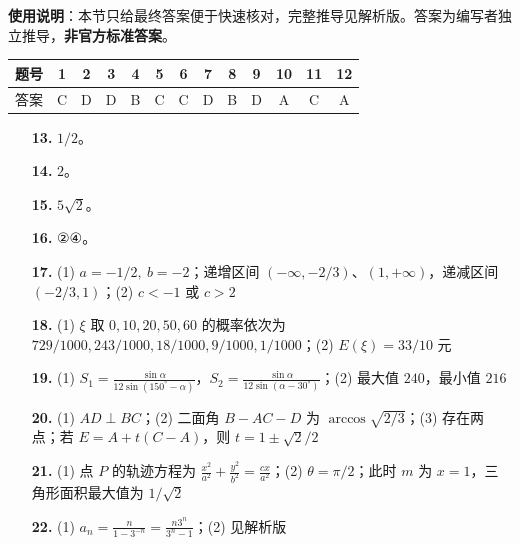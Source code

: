 
\begin{gknotice}
\textbf{使用说明}：本节只给最终答案便于快速核对，完整推导见解析版。答案为编写者独立推导，\textbf{非官方标准答案}。
\end{gknotice}

\begin{center}\begin{tabular}{ccccccccccccc}
\toprule
题号 & 1 & 2 & 3 & 4 & 5 & 6 & 7 & 8 & 9 & 10 & 11 & 12 \\
\midrule
答案 & C & D & D & B & C & C & D & B & D & A & C & A \\
\bottomrule
\end{tabular}\end{center}

\begin{itemize}[leftmargin=2.6em]
  \item[\textbf{13.}] $1/2$。
  \item[\textbf{14.}] $2$。
  \item[\textbf{15.}] $5\sqrt2$。
  \item[\textbf{16.}] ②④。
\end{itemize}

\begin{itemize}[leftmargin=2.6em]
  \item[\textbf{17.}] (1) $a=-1/2,\ b=-2$；递增区间 $(-\infty,-2/3)$、$(1,+\infty)$，递减区间 $(-2/3,1)$；(2) $c<-1$ 或 $c>2$
  \item[\textbf{18.}] (1) $\xi$ 取 $0,10,20,50,60$ 的概率依次为 $729/1000,243/1000,18/1000,9/1000,1/1000$；(2) $E(\xi)=33/10$ 元
  \item[\textbf{19.}] (1) $S_1=\frac{\sin\alpha}{12\sin(150^\circ-\alpha)}$，$S_2=\frac{\sin\alpha}{12\sin(\alpha-30^\circ)}$；(2) 最大值 $240$，最小值 $216$
  \item[\textbf{20.}] (1) $AD\perp BC$；(2) 二面角 $B-AC-D$ 为 $\arccos\sqrt{2/3}$；(3) 存在两点；若 $E=A+t(C-A)$，则 $t=1\pm\sqrt2/2$
  \item[\textbf{21.}] (1) 点 $P$ 的轨迹方程为 $\frac{x^2}{a^2}+\frac{y^2}{b^2}=\frac{cx}{a^2}$；(2) $\theta=\pi/2$；此时 $m$ 为 $x=1$，三角形面积最大值为 $1/\sqrt2$
  \item[\textbf{22.}] (1) $a_n=\frac{n}{1-3^{-n}}=\frac{n3^n}{3^n-1}$；(2) 见解析版
\end{itemize}
